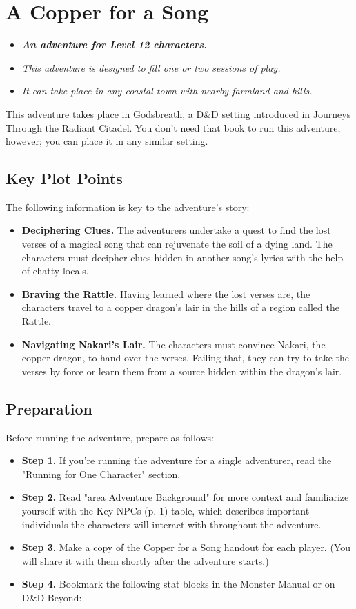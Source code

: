 \documentclass[letterpaper, 11pt, twocolumn]{dndbook}
\begin{document}
\chapter{A Copper for a Song}\label{ch:a-copper-for-a-song-2-2}

\begin{itemize}
\item \textit{ \textbf{An adventure for Level 12 characters.}}
\item \textit{This adventure is designed to fill one or two sessions of play.}
\item \textit{It can take place in any coastal town with nearby farmland and hills.}
\end{itemize}
This adventure takes place in Godsbreath, a D\&D setting introduced in Journeys Through the Radiant Citadel. You don't need that book to run this adventure, however; you can place it in any similar setting.
\section{Key Plot Points}

The following information is key to the adventure's story:

\begin{itemize}
\item \textbf{Deciphering Clues.} The adventurers undertake a quest to find the lost verses of a magical song that can rejuvenate the soil of a dying land. The characters must decipher clues hidden in another song's lyrics with the help of chatty locals.
\item \textbf{Braving the Rattle.} Having learned where the lost verses are, the characters travel to a copper dragon's lair in the hills of a region called the Rattle.
\item \textbf{Navigating Nakari's Lair.} The characters must convince Nakari, the copper dragon, to hand over the verses. Failing that, they can try to take the verses by force or learn them from a source hidden within the dragon's lair.
\end{itemize}
\section{Preparation}

Before running the adventure, prepare as follows:

\begin{itemize}
\item \textbf{Step 1.} If you're running the adventure for a single adventurer, read the "Running for One Character" section.
\item \textbf{Step 2.} Read "area Adventure Background" for more context and familiarize yourself with the Key NPCs (p. 1) table, which describes important individuals the characters will interact with throughout the adventure.
\item \textbf{Step 3.} Make a copy of the Copper for a Song handout for each player. (You will share it with them shortly after the adventure starts.)
\item \textbf{Step 4.} Bookmark the following stat blocks in the Monster Manual or on D\&D Beyond:
\end{itemize}
\end{document}
